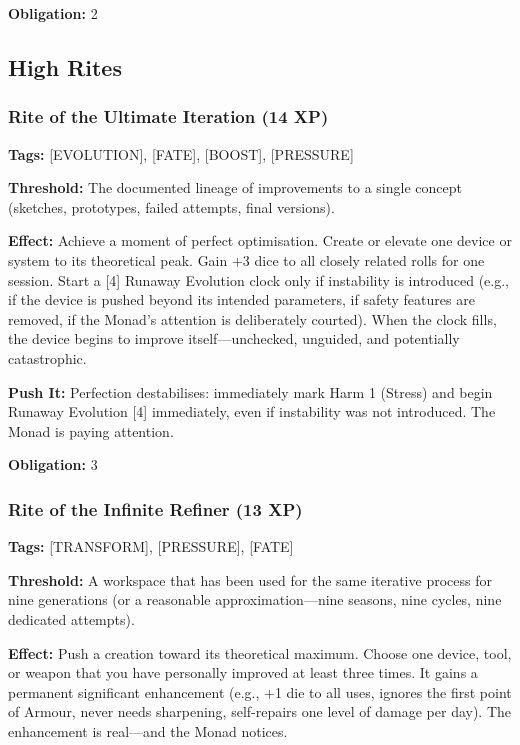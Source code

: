 \textbf{Obligation:} 2

\subsection{High Rites}

\subsubsection{Rite of the Ultimate Iteration (14 XP)}

\textbf{Tags:} [EVOLUTION], [FATE], [BOOST], [PRESSURE]

\textbf{Threshold:} The documented lineage of improvements to a single concept (sketches, prototypes, failed attempts, final versions).

\textbf{Effect:} Achieve a moment of perfect optimisation. Create or elevate one device or system to its theoretical peak. Gain +3 dice to all closely related rolls for one session. Start a [4] Runaway Evolution clock only if instability is introduced (e.g., if the device is pushed beyond its intended parameters, if safety features are removed, if the Monad's attention is deliberately courted). When the clock fills, the device begins to improve itself—unchecked, unguided, and potentially catastrophic.

\textbf{Push It:} Perfection destabilises: immediately mark Harm 1 (Stress) and begin Runaway Evolution [4] immediately, even if instability was not introduced. The Monad is paying attention.

\textbf{Obligation:} 3

\subsubsection{Rite of the Infinite Refiner (13 XP)}

\textbf{Tags:} [TRANSFORM], [PRESSURE], [FATE]

\textbf{Threshold:} A workspace that has been used for the same iterative process for nine generations (or a reasonable approximation—nine seasons, nine cycles, nine dedicated attempts).

\textbf{Effect:} Push a creation toward its theoretical maximum. Choose one device, tool, or weapon that you have personally improved at least three times. It gains a permanent significant enhancement (e.g., +1 die to all uses, ignores the first point of Armour, never needs sharpening, self-repairs one level of damage per day). The enhancement is real—and the Monad notices.

